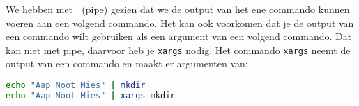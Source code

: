 We hebben met | (pipe) gezien dat we de output van het ene commando kunnen voeren aan een volgend commando. Het kan ook voorkomen dat je de output van een commando wilt gebruiken als een argument van een volgend commando. Dat kan niet met pipe, daarvoor heb je \texttt{xargs} nodig. Het commando \texttt{xargs} neemt de output van een commando en maakt er argumenten van:
\begin{lstlisting}[language=bash]
echo "Aap Noot Mies" | mkdir
echo "Aap Noot Mies" | xargs mkdir
\end{lstlisting}

